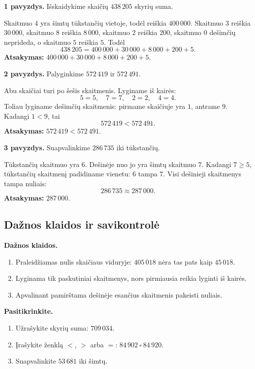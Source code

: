\textbf{1 pavyzdys.} Išskaidykime skaičių \(438\,205\) skyrių suma.

Skaitmuo \(4\) yra šimtų tūkstančių vietoje, todėl reiškia \(400\,000\). Skaitmuo \(3\) reiškia \(30\,000\), skaitmuo \(8\) reiškia \(8\,000\), skaitmuo \(2\) reiškia \(200\), skaitmuo \(0\) dešimčių neprideda, o skaitmuo \(5\) reiškia \(5\). Todėl
\[
438\,205=400\,000+30\,000+8\,000+200+5.
\]
\textbf{Atsakymas:} \(400\,000+30\,000+8\,000+200+5\).

\textbf{2 pavyzdys.} Palyginkime \(572\,419\) ir \(572\,491\).

Abu skaičiai turi po šešis skaitmenis. Lyginame iš kairės:
\[
5=5,\quad 7=7,\quad 2=2,\quad 4=4.
\]
Toliau lyginame dešimčių skaitmenis: pirmame skaičiuje yra \(1\), antrame \(9\). Kadangi \(1<9\), tai
\[
572\,419<572\,491.
\]
\textbf{Atsakymas:} \(572\,419<572\,491\).

\textbf{3 pavyzdys.} Suapvalinkime \(286\,735\) iki tūkstančių.

Tūkstančių skaitmuo yra \(6\). Dešinėje nuo jo yra šimtų skaitmuo \(7\). Kadangi \(7\geq 5\), tūkstančių skaitmenį padidiname vienetu: \(6\) tampa \(7\). Visi dešinieji skaitmenys tampa nuliais:
\[
286\,735\approx 287\,000.
\]
\textbf{Atsakymas:} \(287\,000\).

\subsection{Dažnos klaidos ir savikontrolė}

\textbf{Dažnos klaidos.}
\begin{enumerate}[label=\arabic*.]
\item Praleidžiamas nulis skaičiaus viduryje: \(405\,018\) nėra tas pats kaip \(45\,018\).
\item Lyginama tik paskutiniai skaitmenys, nors pirmiausia reikia lyginti iš kairės.
\item Apvalinant pamirštama dešinėje esančius skaitmenis pakeisti nuliais.
\end{enumerate}

\textbf{Pasitikrinkite.}
\begin{enumerate}[label=\arabic*.]
\item Užrašykite skyrių suma: \(709\,034\).
\item Įrašykite ženklą \(<\), \(>\) arba \(=\): \(84\,902\ \square\ 84\,920\).
\item Suapvalinkite \(53\,681\) iki šimtų.
\end{enumerate}

